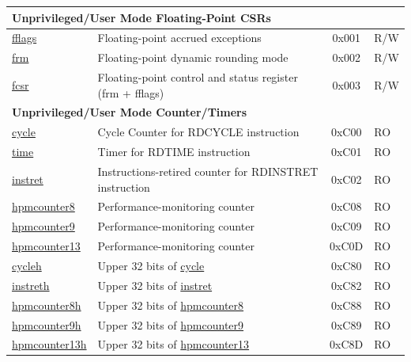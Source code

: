 \begin{longtable}{ | p{4.0cm} | p{8.4cm} | c | l | }
\multicolumn{4}{|l|}{\textbf{Unprivileged/User Mode Floating-Point CSRs}} \\\hline
\hyperref[regdesc:FFLAGS]{fflags} & Floating-point accrued exceptions & 0x001 & R/W \\\hline
\hyperref[regdesc:FRM]{frm} & Floating-point dynamic rounding mode & 0x002 & R/W \\\hline
\hyperref[regdesc:FCSR]{fcsr} & Floating-point control and status register (frm + fflags) & 0x003 & R/W \\\hline

\multicolumn{4}{|l|}{\textbf{Unprivileged/User Mode Counter/Timers }} \\\hline
\hyperref[regdesc:CYCLE]{cycle} & Cycle Counter for RDCYCLE instruction & 0xC00 & RO\\\hline
\hyperref[regdesc:TIME]{time} & Timer for RDTIME instruction & 0xC01 & RO \\\hline
\hyperref[regdesc:INSTRET]{instret} & Instructions-retired counter for RDINSTRET instruction & 0xC02 & RO \\\hline
\hyperref[regdesc:HPMCOUNTER8]{hpmcounter8} & Performance-monitoring counter & 0xC08 & RO \\\hline
\hyperref[regdesc:HPMCOUNTER9]{hpmcounter9} & Performance-monitoring counter & 0xC09 & RO \\\hline
\hyperref[regdesc:HPMCOUNTER13]{hpmcounter13} & Performance-monitoring counter & 0xC0D & RO \\\hline
\hyperref[regdesc:CYCLEH]{cycleh} & Upper 32 bits of \hyperref[regdesc:CYCLE]{cycle} & 0xC80 & RO \\\hline
\hyperref[regdesc:INSTRETH]{instreth} & Upper 32 bits of \hyperref[regdesc:INSTRET]{instret}  & 0xC82 & RO \\\hline
\hyperref[regdesc:HPMCOUNTER8H]{hpmcounter8h} & Upper 32 bits of \hyperref[regdesc:HPMCOUNTER8]{hpmcounter8} & 0xC88 & RO \\\hline
\hyperref[regdesc:HPMCOUNTER9H]{hpmcounter9h} & Upper 32 bits of \hyperref[regdesc:HPMCOUNTER9]{hpmcounter9} & 0xC89 & RO \\\hline
\hyperref[regdesc:HPMCOUNTER13H]{hpmcounter13h} & Upper 32 bits of \hyperref[regdesc:HPMCOUNTER13]{hpmcounter13} & 0xC8D & RO \\\hline


\end{longtable}
